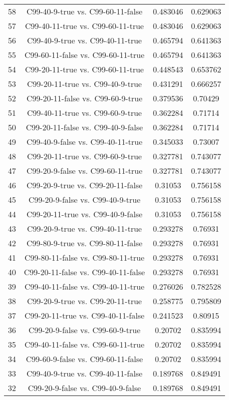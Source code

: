 \documentclass[a4paper,10pt]{article}
\begin{document}
\begin{landscape}
\begin{table}[!htp]
\begin{tabular}{cccc}
58&C99-40-9-true vs. C99-60-11-false&0.483046&0.629063\\
57&C99-40-11-true vs. C99-60-11-true&0.483046&0.629063\\
56&C99-40-9-true vs. C99-40-11-true&0.465794&0.641363\\
55&C99-60-11-false vs. C99-60-11-true&0.465794&0.641363\\
54&C99-20-11-true vs. C99-60-11-true&0.448543&0.653762\\
53&C99-20-11-true vs. C99-40-9-true&0.431291&0.666257\\
52&C99-20-11-false vs. C99-60-9-true&0.379536&0.70429\\
51&C99-40-11-true vs. C99-60-9-true&0.362284&0.71714\\
50&C99-20-11-false vs. C99-40-9-false&0.362284&0.71714\\
49&C99-40-9-false vs. C99-40-11-true&0.345033&0.73007\\
48&C99-20-11-true vs. C99-60-9-true&0.327781&0.743077\\
47&C99-20-9-false vs. C99-60-11-true&0.327781&0.743077\\
46&C99-20-9-true vs. C99-20-11-false&0.31053&0.756158\\
45&C99-20-9-false vs. C99-40-9-true&0.31053&0.756158\\
44&C99-20-11-true vs. C99-40-9-false&0.31053&0.756158\\
43&C99-20-9-true vs. C99-40-11-true&0.293278&0.76931\\
42&C99-80-9-true vs. C99-80-11-false&0.293278&0.76931\\
41&C99-80-11-false vs. C99-80-11-true&0.293278&0.76931\\
40&C99-20-11-false vs. C99-40-11-false&0.293278&0.76931\\
39&C99-40-11-false vs. C99-40-11-true&0.276026&0.782528\\
38&C99-20-9-true vs. C99-20-11-true&0.258775&0.795809\\
37&C99-20-11-true vs. C99-40-11-false&0.241523&0.80915\\
36&C99-20-9-false vs. C99-60-9-true&0.20702&0.835994\\
35&C99-40-11-false vs. C99-60-11-true&0.20702&0.835994\\
34&C99-60-9-false vs. C99-60-11-false&0.20702&0.835994\\
33&C99-40-9-true vs. C99-40-11-false&0.189768&0.849491\\
32&C99-20-9-false vs. C99-40-9-false&0.189768&0.849491\\

\end{tabular}
\end{table}
\end{landscape}
\end{document}
